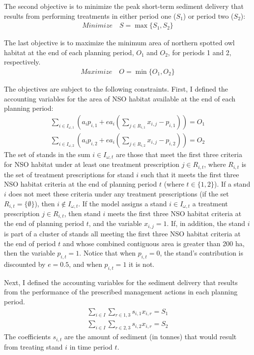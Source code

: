 The second objective is to minimize the peak short-term sediment delivery that results from performing treatments in either period one ($S_1$) or period two ($S_2$):
\begin{align}
Minimize \quad S = \max \{S_1,S_2\}
\end{align}

The last objective is to maximize the minimum area of northern spotted owl habitat at the end of each planning period, $O_1$ and $O_2$, for periods 1 and 2, respectively.
\begin{align}
Maximize \quad O = \min \{O_1,O_2\}
\end{align}

The objectives are subject to the following constraints. First, I defined the accounting variables for the area of NSO habitat available at the end of each planning period:
\begin{align}
\sum_{i\in I_{\omega,1}} \left(a_i p_{i,1} + e a_i \left( \sum_{j \in R_{i,1}} x_{i,j}-p_{i,1} \right) \right) = O_1 \\
\sum_{i\in I_{\omega,2}} \left(a_i p_{i,2} + e a_i \left( \sum_{j \in R_{i,2}} x_{i,j}-p_{i,2} \right) \right) = O_2
\end{align}
The set of stands in the sum $i \in I_{\omega,t}$ are those that meet the first three criteria for NSO habitat under at least one treatment prescription $j \in R_{i,t}$, where $R_{i,t}$ is the set of treatment prescriptions for stand $i$ such that it meets the first three NSO habitat criteria at the end of planning period $t$ (where $t \in \{1,2\}$). If a stand $i$ does not meet these criteria under any treatment prescriptions (if the set $R_{i,t} = \{\emptyset\}$), then $i \notin I_{\omega,t}$. If the model assigns a stand $i \in I_{\omega,t}$ a treatment prescription $j \in R_{i,t}$, then stand $i$ meets the first three NSO habitat criteria at the end of planning period $t$, and the variable $x_{i,j}=1$. If, in addition, the stand $i$ is part of a cluster of stands all meeting the first three NSO habitat criteria at the end of period $t$ and whose combined contiguous area is greater than 200 ha, then the variable $p_{i,t} = 1$. Notice that when $p_{i,t} = 0$, the stand's contribution is discounted by $e = 0.5$, and when $p_{i,t} = 1$ it is not.

Next, I defined the accounting variables for the sediment delivery that results from the performance of the prescribed management actions in each planning period.
\begin{align}
\sum_{i\in I} \sum_{r\in 1,3} s_{i,1} x_{i,r} = S_1\\
\sum_{i\in I} \sum_{r\in 2,3} s_{i,2} x_{i,r} = S_2
\end{align}
The coefficients $s_{i,t}$ are the amount of sediment (in tonnes) that would result from treating stand $i$ in time period $t$.

